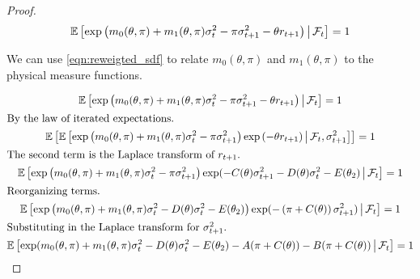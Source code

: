 \documentclass[11pt, letterpaper, twoside]{article}
\begin{document}
\begin{appendices}





\sdfConstants*

\begin{proof}

\begin{equation}
 \label{eqn:reweigted_sdf}
 \operatorname{\mathbb{E}}\left[\exp\left(m_0(\theta, \pi) + m_1(\theta, \pi) \sigma^2_t - \pi \sigma^2_{t+1} - \theta r_{t+1}
 \right) \,\middle\vert\, \mathcal{F}_t \right] = 1 
\end{equation}

We can use \cref{eqn:reweigted_sdf} to relate $m_0(\theta, \pi)$ and $m_1(\theta, \pi)$ to the physical measure
functions. 

\begin{gather}
 \E\left[\exp\left(m_0(\theta, \pi) + m_1(\theta, \pi) \sigma^2_t - \pi \sigma^2_{t+1} - \theta r_{t+1}
 \right) \mvert \F_t \right] = 1 \\
%
 \intertext{By the law of iterated expectations.}
%
 \E\left[ \E\left[\exp\left(m_0(\theta, \pi) + m_1(\theta, \pi) \sigma^2_t - \pi \sigma^2_{t+1}\right)
 \exp\left( - \theta r_{t+1}\right) \mvert \F_t, \sigma^2_{t+1} \right]\right] = 1 \\
%
 \intertext{The second term is the Laplace transform of $r_{t+1}$.}
%
 \E\left[\exp\left(m_0(\theta, \pi) + m_1(\theta, \pi) \sigma^2_t - \pi \sigma^2_{t+1} \right)
 \exp(-C(\theta) \sigma^2_{t+1} - D(\theta) \sigma^2_{t} - E(\theta_2) \mvert \F_t \right] = 1 \\
%
 \intertext{Reorganizing terms.}
%
 \E\left[\exp\left(m_0(\theta, \pi) + m_1(\theta, \pi) \sigma^2_t - D(\theta) \sigma^2_{t} - E(\theta_2)
 \right) \exp(-\left(\pi + C(\theta)\right) \sigma^2_{t+1}) \mvert \F_t \right] = 1 \\ 
%
 \intertext{Substituting in the Laplace transform for $\sigma^2_{t+1}$.} 
%
 \label{eqn:expected_sdf_wrt_PP}
 \E\left[\exp(m_0(\theta, \pi) + m_1(\theta, \pi) \sigma^2_t - D(\theta) \sigma^2_{t} - E(\theta_2) - A(\pi +
 C(\theta)) - B(\pi + C(\theta)) \mvert \F_t \right] = 1 
\end{gather}


\end{proof}
\end{appendices}
\end{document}
